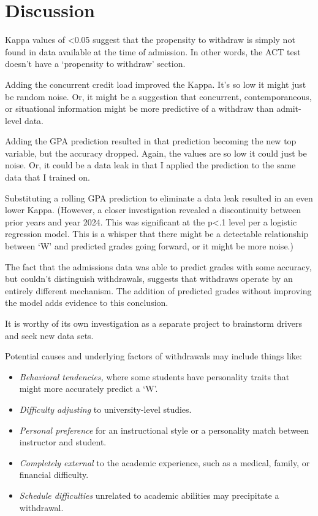 \documentclass[
]{article}
\providecommand{\tightlist}{%
  \setlength{\itemsep}{0pt}\setlength{\parskip}{0pt}}
\begin{document}
\renewcommand*{\arraystretch}{1}

\section{Discussion}\label{discussion}

Kappa values of \textless0.05 suggest that the propensity to withdraw is
simply not found in data available at the time of admission. In other
words, the ACT test doesn't have a `propensity to withdraw' section.

Adding the concurrent credit load improved the Kappa. It's so low it
might just be random noise. Or, it might be a suggestion that
concurrent, contemporaneous, or situational information might be more
predictive of a withdraw than admit-level data.

Adding the GPA prediction resulted in that prediction becoming the new
top variable, but the accuracy dropped. Again, the values are so low it
could just be noise. Or, it could be a data leak in that I applied the
prediction to the same data that I trained on.

Substituting a rolling GPA prediction to eliminate a data leak resulted
in an even lower Kappa. (However, a closer investigation revealed a
discontinuity between prior years and year 2024. This was significant at
the p\textless.1 level per a logistic regression model. This is a
whisper that there might be a detectable relationship between `W' and
predicted grades going forward, or it might be more noise.)

The fact that the admissions data was able to predict grades with some
accuracy, but couldn't distinguish withdrawals, suggests that withdraws
operate by an entirely different mechanism. The addition of predicted
grades without improving the model adds evidence to this conclusion.

It is worthy of its own investigation as a separate project to
brainstorm drivers and seek new data sets.

Potential causes and underlying factors of withdrawals may include
things like:

\begin{itemize}
\tightlist
\item
  \emph{Behavioral tendencies,} where some students have personality
  traits that might more accurately predict a `W'.\\
\item
  \emph{Difficulty adjusting} to university-level studies.\\
\item
  \emph{Personal preference} for an instructional style or a personality
  match between instructor and student.\\
\item
  \emph{Completely external} to the academic experience, such as a
  medical, family, or financial difficulty.\\
\item
  \emph{Schedule difficulties} unrelated to academic abilities may
  precipitate a withdrawal.
\end{itemize}
\end{document}
